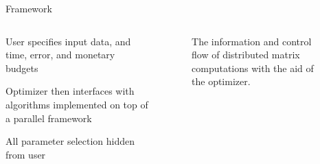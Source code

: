\documentclass[final]{beamer}
\begin{document}
{\begin{frame}{}
\begin{center}
\begin{columns}[t]
\begin{column}{0.32\textwidth}
    \begin{block}{\huge Framework}
\vspace{.5cm}
\begin{columns}[t]
\begin{column}{0.45\textwidth}
	\vspace{2cm}
\begin{itemize}{\Large
\item User specifies input data, and time, error, and monetary budgets
\item Optimizer then interfaces with algorithms implemented on top of a parallel framework
\item All parameter selection hidden from user
}
\end{itemize}    
\end{column}
\begin{column}{.5\textwidth}
\begin{center}
\begin{figure}
\caption[width=\textwidth]{The information and control flow of distributed matrix computations with the aid of the optimizer.}
\end{figure}
\end{center}
\end{column}
\end{columns}
\end{block}


\end{column}
\end{columns}
\end{center}
\end{frame}}
\end{document}
